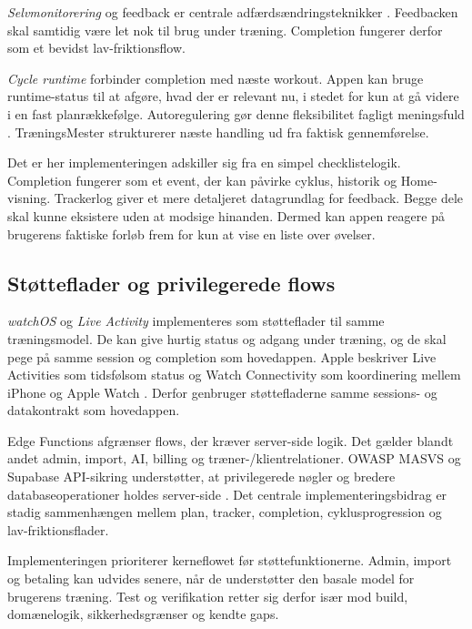 \emph{Selvmonitorering} og feedback er centrale adfærdsændringsteknikker \cite{michie2013_bct_taxonomy_v1}. Feedbacken skal samtidig være let nok til brug under træning. Completion fungerer derfor som et bevidst lav-friktionsflow.

\emph{Cycle runtime} forbinder completion med næste workout. Appen kan bruge runtime-status til at afgøre, hvad der er relevant nu, i stedet for kun at gå videre i en fast planrækkefølge. Autoregulering gør denne fleksibilitet fagligt meningsfuld \cite{greig2020_autoregulation_resistance_training,larsen2021_autoregulation_systematic_review}. TræningsMester strukturerer næste handling ud fra faktisk gennemførelse.

Det er her implementeringen adskiller sig fra en simpel checklistelogik. Completion fungerer som et event, der kan påvirke cyklus, historik og Home-visning. Trackerlog giver et mere detaljeret datagrundlag for feedback. Begge dele skal kunne eksistere uden at modsige hinanden. Dermed kan appen reagere på brugerens faktiske forløb frem for kun at vise en liste over øvelser.

\subsection{Støtteflader og privilegerede flows}

\emph{watchOS} og \emph{Live Activity} implementeres som støtteflader til samme træningsmodel. De kan give hurtig status og adgang under træning, og de skal pege på samme session og completion som hovedappen. Apple beskriver Live Activities som tidsfølsom status og Watch Connectivity som koordinering mellem iPhone og Apple Watch \cite{apple_activitykit_live_data_docs,apple_watchconnectivity_docs}. Derfor genbruger støttefladerne samme sessions- og datakontrakt som hovedappen.

Edge Functions afgrænser flows, der kræver server-side logik. Det gælder blandt andet admin, import, AI, billing og træner-/klientrelationer. OWASP MASVS og Supabase API-sikring understøtter, at privilegerede nøgler og bredere databaseoperationer holdes server-side \cite{owasp2024_masvs,supabase_securing_api_docs}. Det centrale implementeringsbidrag er stadig sammenhængen mellem plan, tracker, completion, cyklusprogression og lav-friktionsflader.

Implementeringen prioriterer kerneflowet før støttefunktionerne. Admin, import og betaling kan udvides senere, når de understøtter den basale model for brugerens træning. Test og verifikation retter sig derfor især mod build, domænelogik, sikkerhedsgrænser og kendte gaps.

